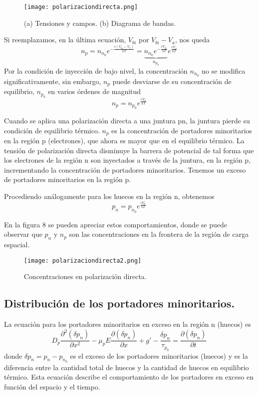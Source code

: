 \documentclass[12pt,a4paper]{article}
\begin{document}
\begin{figure}[ht!]
\begin{center}
\texttt{[image: polarizaciondirecta.png]}
\caption{(a) Tensiones y campos. (b) Diagrama de bandas.}
\end{center}
\end{figure}

Si reemplazamos, en la última ecuación, $V_{bi}$ por $V_{bi}-V_{a}$, nos queda
\[ n_{p}=n_{n_{0}} e^{-\frac{e(V_{bi}-V_{a})}{kT}} =\underbrace{ n_{n_{0}} e^{-\frac{eV_{bi}}{kT}} }_{n_{p_{0}}}e^{\frac{eV_{a}}{kT}} \]
Por la condición de inyección de bajo nivel, la concentración $n_{n_{0}}$ no se modifica significativamente, sin embargo, $n_{p}$ puede desviarse de su concentración de equilibrio, $n_{p_{0}}$ en varios órdenes de magnitud
\[ n_{p}=n_{p_{0}}e^{\frac{eV_{a}}{kT}} \]

Cuando se aplica una polarización directa a una juntura pn, la juntura pierde su condición de equilibrio térmico. $n_{p}$ es la concentración de portadores minoritarios en la región p (electrones), que ahora es mayor que en el equilibrio térmico. La tensión de polarización directa disminuye la barrera de potencial de tal forma que los electrones de la región n son inyectados a través de la juntura, en la región p, incrementando la concentración de portadores minoritarios. Tenemos un exceso de portadores minoritarios en la región p.

Procediendo análogamente para los huecos en la región n, obtenemos
\[ p_{n}=p_{n_{0}} e^{\frac{eV_{a}}{kT}} \]

En la figura 8 se pueden apreciar estos comportamientos, donde se puede observar que $p_{n}$ y $n_{p}$ son las concentraciones en la frontera de la región de carga espacial.

\begin{figure}[ht!]
\begin{center}
\texttt{[image: polarizaciondirecta2.png]}
\caption{Concentraciones en polarización directa.}
\end{center}
\end{figure}

\subsection{Distribución de los portadores minoritarios.}

La ecuación para los portadores minoritarios en exceso en la región n (huecos) es
\[ D_{p} \frac{\partial^{2} (\delta p_{n})}{\partial x^{2}} - \mu _{p}E \frac{\partial (\delta p_{n})}{\partial x} + g' - \frac{\delta p_{n}}{\tau _{p_{0}}} = \frac{\partial (\delta p_{n})}{\partial t} \]
donde $\delta p_{n}=p_{n}-p_{n_{0}}$ es el exceso de los portadores minoritarios (huecos) y es la diferencia entre la cantidad total de huecos y la cantidad de huecos en equilibrio térmico. Esta ecuación describe el comportamiento de los portadores en exceso en función del espacio y el tiempo.
\end{document}
